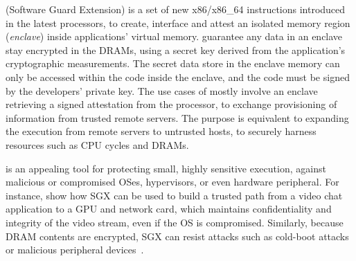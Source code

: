 


\intel{} \sgx{} (Software Guard Extension)
is a set of new x86/x86\_64 instructions
introduced in the latest \intel{} \skylake{} processors,
to create, interface and attest
an isolated memory region (\emph{enclave}) inside applications' virtual memory.
\sgx{} guarantee any data in an enclave
stay encrypted in the DRAMs, using a secret key derived from
the application's cryptographic measurements.
The secret data store in the enclave memory
can only be accessed within the code inside the enclave,
and the code must be signed by the developers' private key.
The use cases of \sgx{} mostly involve an enclave
retrieving a signed attestation from the \intel{} processor,
to exchange provisioning of information from trusted remote servers.
The purpose is equivalent to
expanding the execution from remote servers
to untrusted hosts,
to securely harness resources such as CPU cycles and DRAMs.

\sgx{} is an appealing tool for protecting small, highly sensitive execution, 
against malicious or compromised OSes, hypervisors, or even hardware peripheral.
For instance, \cite{hoekstra13sgx} show how SGX can be used
to build a trusted path from a video chat application to a GPU and network card, which maintains confidentiality and integrity of the
video stream, even if the OS is compromised.
Similarly, because DRAM contents are encrypted, SGX can resist attacks such as cold-boot attacks~\cite{halderman09coldboot} or 
malicious peripheral devices~\cite{hudson15thunderstrike}.

